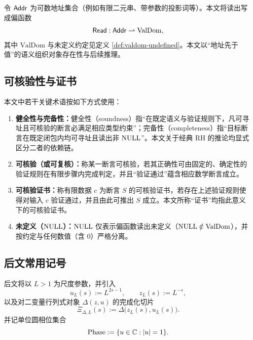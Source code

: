 令 $\mathsf{Addr}$ 为可数地址集合（例如有限二元串、带参数的投影词等）。本文将读出写成偏函数
$$
\mathsf{Read}:\mathsf{Addr}\rightharpoonup \mathrm{ValDom},
$$
其中 $\mathrm{ValDom}$ 与未定义约定见定义 \ref{def:valdom-undefined}。本文以“地址先于值”的语义组织对象存在性与后续推理。

\subsection{可核验性与证书}
本文中若干关键术语按如下方式使用：
\begin{enumerate}
  \item \textbf{健全性与完备性：}健全性（soundness）指“在既定语义与验证规则下，凡可寻址且可核验的断言必满足相应类型约束”；完备性（completeness）指“目标断言在既定闭包内均可寻址且读出非 $\mathrm{NULL}$”。本文关于经典 RH 的推论均显式区分二者的依赖链。
  \item \textbf{可核验（或可复核）：}称某一断言可核验，若其正确性可由固定的、确定性的验证规则在有限步骤内完成判定，并且“验证通过”蕴含相应数学断言成立。
  \item \textbf{可核验证书：}称有限数据 $c$ 为断言 $S$ 的可核验证书，若存在上述验证规则使得对输入 $c$ 验证通过，并且由此可推出 $S$ 成立。本文所称“证书”均指此意义下的可核验证书。
  \item \textbf{未定义（$\mathrm{NULL}$）：}$\mathrm{NULL}$ 仅表示偏函数读出未定义（$\mathrm{NULL}\notin\mathrm{ValDom}$），并按约定与任何数值（含 $0$）严格分离。
\end{enumerate}

\subsection{后文常用记号}
后文将以 $L>1$ 为尺度参数，并引入
$$
u_L(s):=L^{2s-1},\qquad z_L(s):=L^{-s},
$$
以及对二变量行列式对象 $\Delta(z,u)$ 的完成化切片
$$
\Xi_{\Delta,L}(s):=\Delta\bigl(z_L(s),u_L(s)\bigr).
$$
并记单位圆相位集合
$$
\mathrm{Phase}:=\{u\in\mathbb{C}:\left\lvert u\right\rvert=1\}.
$$

